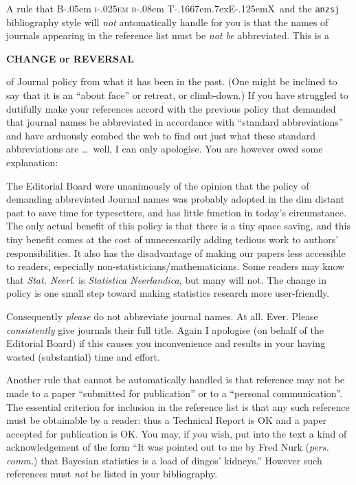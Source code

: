 \documentclass[times, doublespace]{anzsauth}
\newcommand\BibTeX{{\rmfamily B\kern-.05em \textsc{i\kern-.025em b}\kern-.08em
T\kern-.1667em\lower.7ex\hbox{E}\kern-.125emX}}
\begin{document}
A rule that \BibTeX\ and the \texttt{anzsj} bibliography style will
\emph{not} automatically handle for you is that the names of journals
appearing in the reference list must be \emph{not be} abbreviated.
This is a
\begin{center}
{\large \textbf{CHANGE or REVERSAL}}
\end{center}
of Journal policy from what it has been in the past. (One might
be inclined to say that it is an ``about face'' or retreat, or
climb-down.)  If you have struggled to dutifully make your references
accord with the previous policy that demanded that journal names
be abbreviated in accordance with ``standard abbreviations'' and
have arduously combed the web to find out just what these standard
abbreviations are \ldots\ well, I can only apologise.  You are however
owed some explanation:

The Editorial Board were unanimously of the opinion that
the policy of demanding abbreviated Journal names was probably
adopted in the dim distant past to save time for typesetters,
and has little function in today's circumstance.  The only actual
benefit of this policy is that there is a tiny space saving,
and this tiny benefit comes at the cost of unnecessarily adding
tedious work to authors' responsibilities.  It also has the
disadvantage of making our papers less accessible to readers,
especially non-statisticians/mathematicians. Some readers may know
that \textit{Stat. Neerl.} is \textit{Statistica Neerlandica},
but many will not.  The change in policy is one small step toward
making statistics research more user-friendly.

Consequently \emph{please} do not abbreviate journal names.  At all.
Ever.  Please \emph{consistently} give journals their full title.
Again I apologise (on behalf of the Editorial Board) if this causes
you inconvenience and results in your having wasted (substantial)
time and effort.

Another rule that cannot be automatically handled is that reference
may not be made to a paper ``submitted for publication'' or to a
``personal communication''. The essential criterion for inclusion
in the reference list is that any such reference must be obtainable
by a reader: thus a Technical Report is OK and a paper accepted for
publication is OK.  You may, if you wish, put into the text a kind
of acknowledgement of the form ``It was pointed out to me by Fred
Nurk (\textit{pers. comm.}) that Bayesian statistics is a load
of dingos' kidneys.''  However such references must \emph{not}
be listed in your bibliography.
\end{document}
